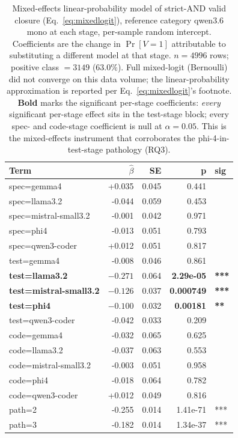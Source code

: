 \begin{table}[!htbp]
\centering
\small
\caption{Mixed-effects linear-probability model of strict-AND valid closure (Eq.~\ref{eq:mixedlogit}), reference category qwen3.6 mono at each stage, per-sample random intercept. Coefficients are the change in $\Pr[V=1]$ attributable to substituting a different model at that stage. $n = 4996$ rows; positive class $= 3149$ ($63.0\%$). Full mixed-logit (Bernoulli) did not converge on this data volume; the linear-probability approximation is reported per Eq.~\ref{eq:mixedlogit}'s footnote. \textbf{Bold} marks the significant per-stage coefficients: \emph{every} significant per-stage effect sits in the test-stage block; every spec- and code-stage coefficient is null at $\alpha = 0.05$. This is the mixed-effects instrument that corroborates the phi-4-in-test-stage pathology (RQ3).}
\label{tab:mixed_logit}
\begin{tabular}{@{}lrrrl@{}}
\toprule
Term & $\hat{\beta}$ & SE & p & sig \\
\midrule
spec=gemma4 & +0.035 & 0.045 & 0.441 &  \\
spec=llama3.2 & -0.044 & 0.059 & 0.453 &  \\
spec=mistral-small3.2 & -0.001 & 0.042 & 0.971 &  \\
spec=phi4 & -0.013 & 0.051 & 0.793 &  \\
spec=qwen3-coder & +0.012 & 0.051 & 0.817 &  \\
test=gemma4 & -0.008 & 0.046 & 0.861 &  \\
\textbf{test=llama3.2} & $\mathbf{-0.271}$ & 0.064 & \textbf{2.29e-05} & \textbf{***} \\
\textbf{test=mistral-small3.2} & $\mathbf{-0.126}$ & 0.037 & \textbf{0.000749} & \textbf{***} \\
\textbf{test=phi4} & $\mathbf{-0.100}$ & 0.032 & \textbf{0.00181} & \textbf{**} \\
test=qwen3-coder & -0.042 & 0.033 & 0.209 &  \\
code=gemma4 & -0.032 & 0.065 & 0.625 &  \\
code=llama3.2 & -0.037 & 0.063 & 0.553 &  \\
code=mistral-small3.2 & -0.003 & 0.051 & 0.958 &  \\
code=phi4 & -0.018 & 0.064 & 0.782 &  \\
code=qwen3-coder & +0.012 & 0.049 & 0.816 &  \\
\midrule
path=2 & -0.255 & 0.014 & 1.41e-71 & *** \\
path=3 & -0.182 & 0.014 & 1.34e-37 & *** \\
\bottomrule
\end{tabular}
\end{table}

